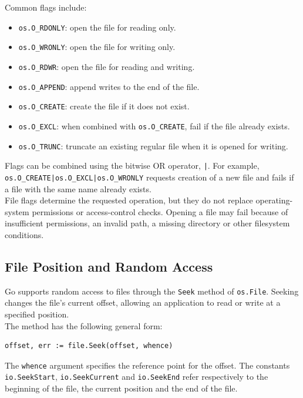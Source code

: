 Common flags include:

\begin{itemize}
    \item \texttt{os.O\_RDONLY}: open the file for reading only.
    \item \texttt{os.O\_WRONLY}: open the file for writing only.
    \item \texttt{os.O\_RDWR}: open the file for reading and writing.
    \item \texttt{os.O\_APPEND}: append writes to the end of the file.
    \item \texttt{os.O\_CREATE}: create the file if it does not exist.
    \item \texttt{os.O\_EXCL}: when combined with \texttt{os.O\_CREATE}, fail if the file already exists.
    \item \texttt{os.O\_TRUNC}: truncate an existing regular file when it is opened for writing.
\end{itemize}

Flags can be combined using the bitwise OR operator, \texttt{|}. For example, \texttt{os.O\_CREATE|os.O\_EXCL|os.O\_WRONLY} requests creation of a new file and fails if a file with the same name already exists.\\

File flags determine the requested operation, but they do not replace operating-system permissions or access-control checks. Opening a file may fail because of insufficient permissions, an invalid path, a missing directory or other filesystem conditions.

\subsection{File Position and Random Access}

Go supports random access to files through the \texttt{Seek} method of \texttt{os.File}. Seeking changes the file's current offset, allowing an application to read or write at a specified position.\\

The method has the following general form:

\begin{lstlisting}
offset, err := file.Seek(offset, whence)
\end{lstlisting}

The \texttt{whence} argument specifies the reference point for the offset. The constants \texttt{io.SeekStart}, \texttt{io.SeekCurrent} and \texttt{io.SeekEnd} refer respectively to the beginning of the file, the current position and the end of the file.\\

